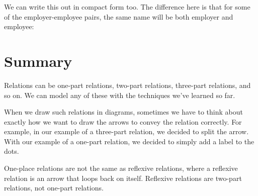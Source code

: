 \documentclass[../../../main.tex]{subfiles}
\begin{document}
\noindent
We can write this out in compact form too. The difference here is that for some of the employer-employee pairs, the same name will be both employer and employee:

\begin{model}
\end{model}


\section{Summary}

Relations can be one-part relations, two-part relations, three-part relations, and so on. We can model any of these with the techniques we've learned so far.

When we draw such relations in diagrams, sometimes we have to think about exactly how we want to draw the arrows to convey the relation correctly. For example, in our example of a three-part relation, we decided to split the arrow. With our example of a one-part relation, we decided to simply add a label to the dots. 

One-place relations are not the same as reflexive relations, where a reflexive relation is an arrow that loops back on itself. Reflexive relations are two-part relations, not one-part relations.
\end{document}
